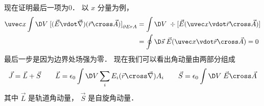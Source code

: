 现在证明最后一项为0． 以 $x$ 分量为例，
\begin{equation}
\begin{aligned}
  \uvec x\int {\D V\;{{[(\vec E \vdot \vec\nabla )(\vec r \cross \vec A)]}_{\partial ErA}}}  &= \int {\D V\; \div [\vec E(\uvec x \vdot \vec r \cross \vec A) ]} \\
  &= \oint {\D \vec s\;\vec E(\uvec x \vdot \vec r \cross \vec A)}  = 0
\end{aligned}
\end{equation}
最后一步是因为边界处场强为零． 现在我们可以看出角动量由两部分组成
\begin{equation}
\vec J = \vec L + \vec S
\qquad
\vec L = {\epsilon _0}\int {\D V\sum\limits_i {{E_i}} (\vec r \cross \vec\nabla ){A_i}}
\qquad
\vec S = {\epsilon _0}\int {\D V\;\vec E \cross \vec A} 
\end{equation}
其中 $\vec L$ 是轨道角动量， $\vec S$ 是自旋角动量．
